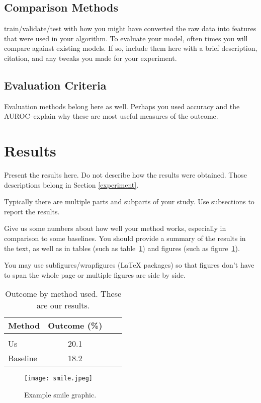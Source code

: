 \documentclass[twoside,11pt]{article}
\begin{document}
\subsection{Comparison Methods}
train/validate/test
with how you might have converted the raw data into features that were used in your algorithm. 
To evaluate your model, often times you will compare against existing models.
If so, include them here with a brief description, citation, and any tweaks you made for your experiment.

\subsection{Evaluation Criteria}
Evaluation methods belong here as well.
Perhaps you used accuracy and the AUROC--explain why these are most useful measures of the outcome.

\section{Results} \label{results}

Present the results here.
Do not describe how the results were obtained.
Those descriptions belong in Section \ref{experiment}.

Typically there are multiple parts and subparts of your study.
Use subsections to report the results.

Give us some numbers about how well your method works, especially in comparison to some baselines.
You should provide a summary of the results in the text, as well as in tables (such as table~\ref{tab:example}) and figures (such as figure~\ref{fig:example}).  

You may use subfigures/wrapfigures (LaTeX packages) so that figures don't have to span the whole page or multiple figures are side by side.

\begin{table}[htbp]
  \centering 
  \begin{tabular}{lclc} 
    Method & Outcome (\%) \\ 
    \hline \\[-11pt]
    Us & 20.1 \\ 
    Baseline & 18.2 \\ \hline 
  \end{tabular}
  \label{tab:example} 
    \caption{Outcome by method used. These are our results.} 
\end{table}

\begin{figure}[htbp]
  \centering 
  \texttt{[image: smile.jpeg]} 
  \caption{Example smile graphic.}
  \label{fig:example} 
\end{figure} 
\end{document}

